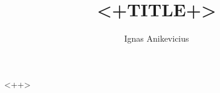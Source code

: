 \documentclass[
    draft
]{scrartcl}
\title{<+TITLE+>}<++>
\author{Ignas Anikevicius}
\begin{document}
\maketitle
\tableofcontents
\listoftodos
\clearpage

<++>
\end{document}

